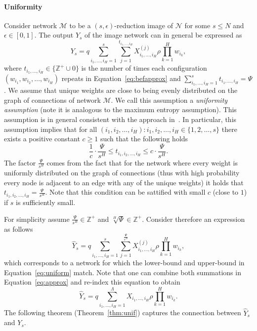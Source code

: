 \documentclass[twoside]{article}
\begin{document}
\paragraph{Uniformity}
Consider network $\mathcal{M}$ to be a $(s,\epsilon)$-reduction image of $\mathcal{N}$ for some $s \leq N$ and $\epsilon \in [0,1]$. The output $Y_s$ of the image network can in general be expressed as
\[Y_s = q\sum_{i_1,\dots,i_H=1}^{s}\sum_{j=1}^{t_{i_1,\dots,i_H}}X_{i_1,\dots,i_H}^{(j)}\rho\prod_{k = 1}^{H}w_{i_k},
\]
where $t_{i_1,\dots,i_H} \in \{\mathbb{Z}^{+}\cup{0}\}$ is the number of times each configuration $(w_{i_1},w_{i_2},\dots,w_{i_H})$ repeats in Equation~\ref{eq:befapprox} and $\sum_{i_1,\dots,i_H=1}^{s}t_{i_1,\dots,i_H} = \Psi$. We assume that unique weights are close to being evenly distributed on the graph of connections of network $\mathcal{M}$. We call this assumption a \textit{uniformity assumption} (note it is analogous to the maximum entropy assumption). This assumption is in general consistent with the approach in~\cite{NIPS2013_5025}. In particular, this assumption implies that for all $(i_1,i_2,\dots,i_H):i_1,i_2,\dots,i_H \in \{1,2,\dots,s\}$ there exists a positive constant $c \geq 1$ such that the following holds
\begin{equation}
\frac{1}{c}\cdot\frac{\Psi}{s^H} \leq t_{i_1,i_2,\dots,i_H} \leq c\cdot\frac{\Psi}{s^H}.
\label{eq:uniform}
\end{equation}
The factor $\frac{\Psi}{s^H}$ comes from the fact that for the network where every weight is uniformly distributed on the graph of connections (thus with high probability every node is adjacent to an edge with any of the unique weights) it holds that $t_{i_1,i_2,\dots,i_H} = \frac{\Psi}{s^H}$. Note that this condition can be sattified with small $c$ (close to $1$) if $s$ is sufficiently small.

For simplicity assume $\frac{\Psi}{s^H} \in \mathbb{Z}^{+}$ and $\sqrt[H]{\Psi} \in \mathbb{Z}^{+}$. Consider therefore an expression as follows
\begin{equation}
\hat{Y}_s = q\sum_{i_1,\dots,i_H=1}^{s}\sum_{j=1}^{\frac{\Psi}{s^H}}X_{i_1,\dots,i_H}^{(j)}\rho\prod_{k = 1}^{H}w_{i_k},
\label{eq:approx}
\end{equation}
which corresponds to a network for which the lower-bound and upper-bound in Equation~\ref{eq:uniform} match. Note that one can combine both summations in Equation~\ref{eq:approx} and re-index this equation to obtain
\begin{equation}
\hat{Y}_s = q\sum_{i_1,\dots,i_H=1}^{\Lambda}X_{i_1,\dots,i_H}\rho\prod_{k = 1}^{H}w_{i_k}.
\label{eq:approxfinal}
\end{equation}
The following theorem (Theorem~\ref{thm:unif}) captures the connection between $\hat{Y}_s$ and $Y_{s}$.
\end{document}
